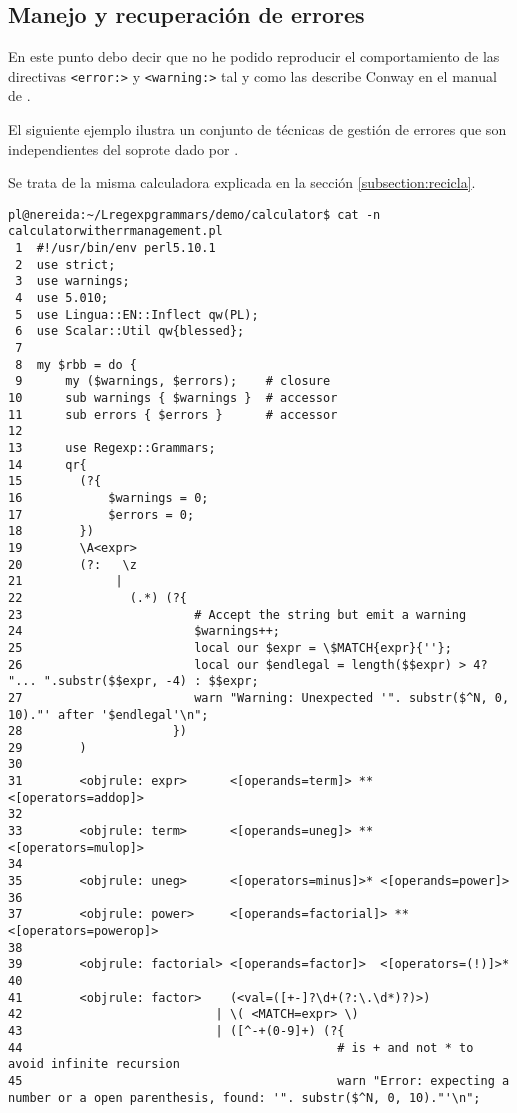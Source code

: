 \subsection{Manejo y recuperación de errores}

En este punto debo decir que no he podido reproducir el comportamiento
de las directivas \verb|<error:>| y \verb|<warning:>| tal y como las describe 
Conway en el manual de \regexpg{}. 

El siguiente ejemplo ilustra un conjunto de técnicas de gestión de errores
que son independientes del soprote dado por \regexpg{}.

Se trata de la misma calculadora explicada en la sección
\ref{subsection:recicla}.

\begin{verbatim}
pl@nereida:~/Lregexpgrammars/demo/calculator$ cat -n calculatorwitherrmanagement.pl
 1  #!/usr/bin/env perl5.10.1
 2  use strict;
 3  use warnings;
 4  use 5.010;
 5  use Lingua::EN::Inflect qw(PL);
 6  use Scalar::Util qw{blessed};
 7
 8  my $rbb = do {
 9      my ($warnings, $errors);    # closure
10      sub warnings { $warnings }  # accessor
11      sub errors { $errors }      # accessor
12
13      use Regexp::Grammars;
14      qr{
15        (?{
16            $warnings = 0;
17            $errors = 0;
18        })
19        \A<expr>
20        (?:   \z
21             |
22               (.*) (?{
23                        # Accept the string but emit a warning
24                        $warnings++;
25                        local our $expr = \$MATCH{expr}{''};
26                        local our $endlegal = length($$expr) > 4? "... ".substr($$expr, -4) : $$expr;
27                        warn "Warning: Unexpected '". substr($^N, 0, 10)."' after '$endlegal'\n";
28                     })
29        )
30
31        <objrule: expr>      <[operands=term]> ** <[operators=addop]>
32
33        <objrule: term>      <[operands=uneg]> ** <[operators=mulop]>
34
35        <objrule: uneg>      <[operators=minus]>* <[operands=power]>
36
37        <objrule: power>     <[operands=factorial]> ** <[operators=powerop]>
38
39        <objrule: factorial> <[operands=factor]>  <[operators=(!)]>*
40
41        <objrule: factor>    (<val=([+-]?\d+(?:\.\d*)?)>)
42                           | \( <MATCH=expr> \)
43                           | ([^-+(0-9]+) (?{
44                                            # is + and not * to avoid infinite recursion
45                                            warn "Error: expecting a number or a open parenthesis, found: '". substr($^N, 0, 10)."'\n";

\end{verbatim}
